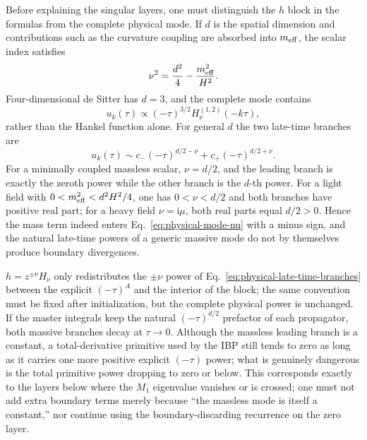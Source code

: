 \documentclass[11pt,a4paper]{article}
\newcommand{\ii}{\mathrm i}
\begin{document}
Before explaining the singular layers, one must distinguish the $h$ block in the formulas from the complete physical mode. If $d$ is the spatial dimension and contributions such as the curvature coupling are absorbed into $m_{\rm eff}$, the scalar index satisfies
\begin{equation}
 \nu^2=\frac{d^2}{4}-\frac{m_{\rm eff}^2}{H^2}.
 \label{eq:physical-mode-nu}
\end{equation}
Four-dimensional de Sitter has $d=3$, and the complete mode contains
\begin{equation}
 u_k(\tau)\propto(-\tau)^{3/2}H_\nu^{(1,2)}(-k\tau),
 \label{eq:physical-mode-full-power}
\end{equation}
rather than the Hankel function alone. For general $d$ the two late-time branches are
\begin{equation}
 u_k(\tau)\sim c_-(-\tau)^{d/2-\nu}
 +c_+(-\tau)^{d/2+\nu}.
 \label{eq:physical-late-time-branches}
\end{equation}
For a minimally coupled massless scalar, $\nu=d/2$, and the leading branch is exactly the zeroth power while the other branch is the $d$-th power. For a light field with $0<m_{\rm eff}^2<d^2H^2/4$, one has $0<\nu<d/2$ and both branches have positive real part; for a heavy field $\nu=\ii\mu$, both real parts equal $d/2>0$. Hence the mass term indeed enters Eq.~\eqref{eq:physical-mode-nu} with a minus sign, and the natural late-time powers of a generic massive mode do not by themselves produce boundary divergences.

$h=z^{\pm\nu}H_\nu$ only redistributes the $\pm\nu$ power of Eq.~\eqref{eq:physical-late-time-branches} between the explicit $(-\tau)^A$ and the interior of the block; the same convention must be fixed after initialization, but the complete physical power is unchanged. If the master integrals keep the natural $(-\tau)^{d/2}$ prefactor of each propagator, both massive branches decay at $\tau\to0$. Although the massless leading branch is a constant, a total-derivative primitive used by the IBP still tends to zero as long as it carries one more positive explicit $(-\tau)$ power; what is genuinely dangerous is the total primitive power dropping to zero or below. This corresponds exactly to the layers below where the $M_1$ eigenvalue vanishes or is crossed; one must not add extra boundary terms merely because ``the massless mode is itself a constant,'' nor continue using the boundary-discarding recurrence on the zero layer.
\end{document}

